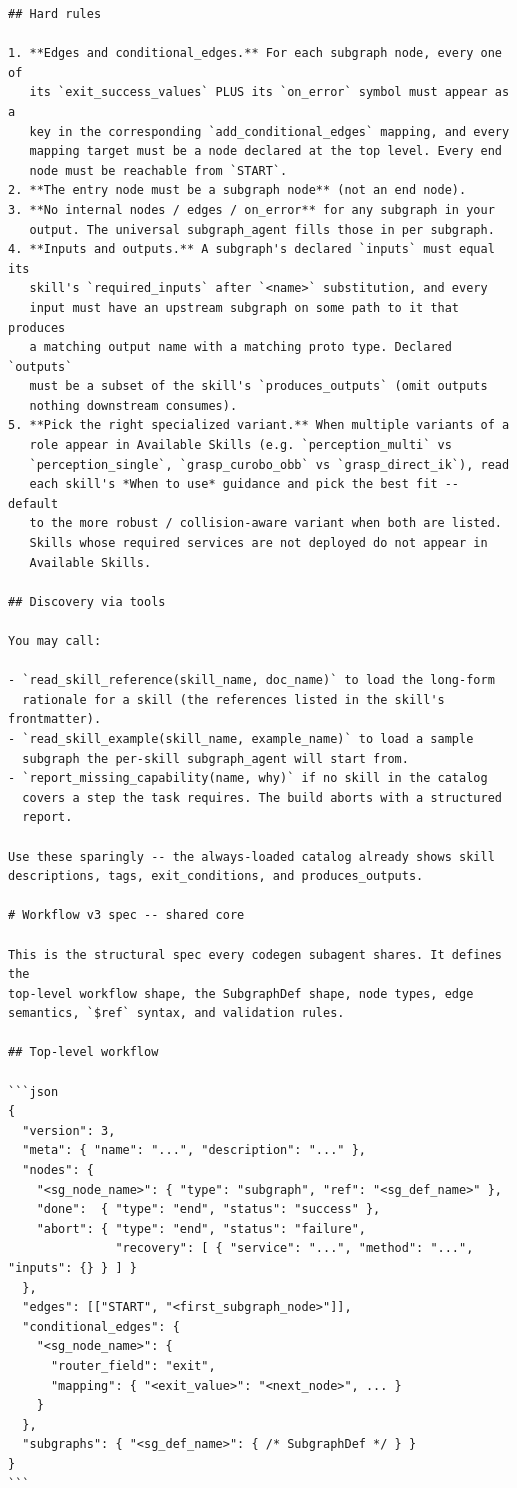 \begin{lstlisting}
## Hard rules

1. **Edges and conditional_edges.** For each subgraph node, every one of
   its `exit_success_values` PLUS its `on_error` symbol must appear as a
   key in the corresponding `add_conditional_edges` mapping, and every
   mapping target must be a node declared at the top level. Every end
   node must be reachable from `START`.
2. **The entry node must be a subgraph node** (not an end node).
3. **No internal nodes / edges / on_error** for any subgraph in your
   output. The universal subgraph_agent fills those in per subgraph.
4. **Inputs and outputs.** A subgraph's declared `inputs` must equal its
   skill's `required_inputs` after `<name>` substitution, and every
   input must have an upstream subgraph on some path to it that produces
   a matching output name with a matching proto type. Declared `outputs`
   must be a subset of the skill's `produces_outputs` (omit outputs
   nothing downstream consumes).
5. **Pick the right specialized variant.** When multiple variants of a
   role appear in Available Skills (e.g. `perception_multi` vs
   `perception_single`, `grasp_curobo_obb` vs `grasp_direct_ik`), read
   each skill's *When to use* guidance and pick the best fit -- default
   to the more robust / collision-aware variant when both are listed.
   Skills whose required services are not deployed do not appear in
   Available Skills.

## Discovery via tools

You may call:

- `read_skill_reference(skill_name, doc_name)` to load the long-form
  rationale for a skill (the references listed in the skill's frontmatter).
- `read_skill_example(skill_name, example_name)` to load a sample
  subgraph the per-skill subgraph_agent will start from.
- `report_missing_capability(name, why)` if no skill in the catalog
  covers a step the task requires. The build aborts with a structured
  report.

Use these sparingly -- the always-loaded catalog already shows skill
descriptions, tags, exit_conditions, and produces_outputs.

# Workflow v3 spec -- shared core

This is the structural spec every codegen subagent shares. It defines the
top-level workflow shape, the SubgraphDef shape, node types, edge
semantics, `$ref` syntax, and validation rules.

## Top-level workflow

```json
{
  "version": 3,
  "meta": { "name": "...", "description": "..." },
  "nodes": {
    "<sg_node_name>": { "type": "subgraph", "ref": "<sg_def_name>" },
    "done":  { "type": "end", "status": "success" },
    "abort": { "type": "end", "status": "failure",
               "recovery": [ { "service": "...", "method": "...", "inputs": {} } ] }
  },
  "edges": [["START", "<first_subgraph_node>"]],
  "conditional_edges": {
    "<sg_node_name>": {
      "router_field": "exit",
      "mapping": { "<exit_value>": "<next_node>", ... }
    }
  },
  "subgraphs": { "<sg_def_name>": { /* SubgraphDef */ } }
}
```


\end{lstlisting}
